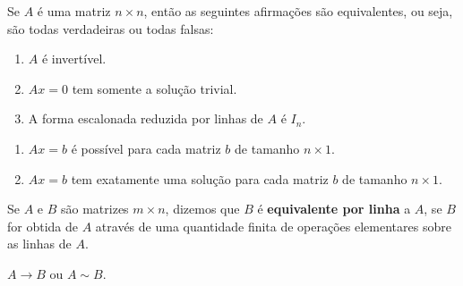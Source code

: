 \documentclass{beamer}
\begin{document}
    \begin{frame}
        \begin{teorema}
            Se $A$ é uma matriz $n \times n$, \pause então as seguintes afirmações são equivalentes, \pause ou seja, são todas verdadeiras \pause ou todas falsas:\pause
            \begin{enumerate}[label={\roman*})]
                \item $A$ é invertível.\pause

                \vspace{1cm}

                \item $Ax = 0$ \pause tem somente a solução trivial.\pause

                \vspace{1cm}

                \item A forma escalonada reduzida por linhas \pause de $A$ é $I_n$.

                \seti
            \end{enumerate}
        \end{teorema}
    \end{frame}

    \begin{frame}
        \begin{teorema}
            \begin{enumerate}[label={\roman*})]
                \conti



                \item $Ax = b$ é possível \pause para cada matriz $b$ de tamanho $n \times 1$.\pause

                \vspace{1cm}

                \item $Ax = b$ tem exatamente uma solução \pause para cada matriz $b$ de tamanho $n \times 1$.
            \end{enumerate}
        \end{teorema}
    \end{frame}

    \begin{frame}
        \begin{definicao}
            Se $A$ e $B$ são matrizes $m \times n$, \pause dizemos que $B$ é \textbf{equivalente por linha} \pause a $A$, \pause se $B$ for obtida de $A$ \pause através de uma quantidade finita de operações elementares sobre as linhas de $A$.\pause
        \end{definicao}

        \vspace{.6cm}

        \begin{notacao}
            $A \rightarrow B$ \pause ou $A \sim B$.
        \end{notacao}
    \end{frame}
\end{document}
